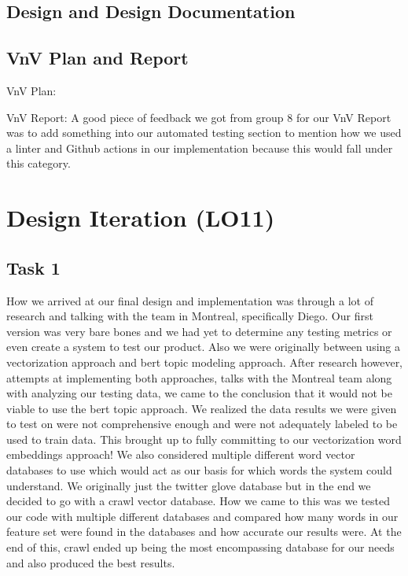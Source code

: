 \documentclass{article}
\begin{document}
\subsection{Design and Design Documentation}

\subsection{VnV Plan and Report}
   \item VnV Plan:
   \item VnV Report:
       A good piece of feedback we got from group 8 for our VnV Report was to add something into our automated testing section to
       mention how we used a linter and Github actions in our implementation because this would fall under this category.
       
\section{Design Iteration (LO11)}


\subsection{Task 1}
How we arrived at our final design and implementation was through a lot of research and talking with the team in Montreal, specifically Diego. Our first version was very bare bones and we had yet to determine any testing metrics or even create a system to test our product. Also we were originally between using a vectorization approach and bert topic modeling approach. After research however, attempts at implementing both approaches, talks with the Montreal team along with analyzing our testing data, we came to the conclusion that it would not be viable to use the bert topic approach. We realized the data results we were given to test on were not comprehensive enough and were not adequately labeled to be used to train data. This brought up to fully committing to our vectorization word embeddings approach! We also considered multiple different word vector databases to use which would act as our basis for which words the system could understand. We originally just the twitter glove database but in the end we decided to go with a crawl vector database. How we came to this was we tested our code with multiple different databases and compared how many words in our feature set were found in the databases and how accurate our results were. At the end of this, crawl ended up being the most encompassing database for our needs and also produced the best results.
\end{document}
